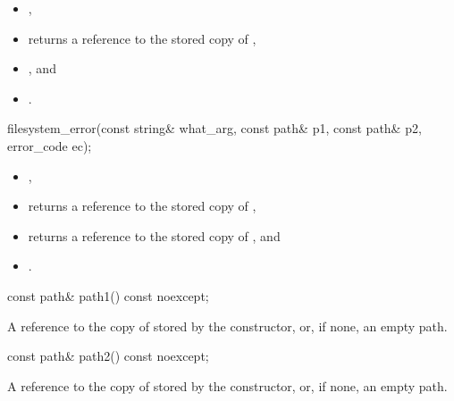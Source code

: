 \begin{itemdescr}
\pnum
\ensures
\begin{itemize}
\item {},
\item {} returns a reference to the stored copy of ,
\item {}, and
\item {} .
\end{itemize}
\end{itemdescr}

%
\begin{itemdecl}
filesystem_error(const string& what_arg, const path& p1, const path& p2, error_code ec);
\end{itemdecl}

\begin{itemdescr}
\pnum
\ensures
\begin{itemize}
\item {},
\item {} returns a reference to the stored copy of ,
\item {} returns a reference to the stored copy of , and
\item {} .
\end{itemize}
\end{itemdescr}

%
\begin{itemdecl}
const path& path1() const noexcept;
\end{itemdecl}

\begin{itemdescr}
\pnum
\returns
A reference to the copy of  stored by the
  constructor, or, if none, an empty path.
\end{itemdescr}

%
\begin{itemdecl}
const path& path2() const noexcept;
\end{itemdecl}

\begin{itemdescr}
\pnum
\returns
A reference to the copy of  stored by the
  constructor, or, if none, an empty path.
\end{itemdescr}

